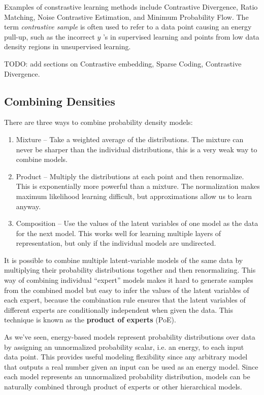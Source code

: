 \documentclass{article}
\begin{document}
Examples of constrastive learning methods include Contrastive Divergence, Ratio Matching, Noise Contrastive Estimation, and Minimum Probability Flow. The term \textit{contrastive sample} is often used to refer to a data point causing an energy pull-up, such as the incorrect $y$ ’s in supervised learning and points from low data density regions in unsupervised learning.

TODO: add sections on Contrastive embedding, Sparse Coding, Contrastive Divergence.

\subsection{Combining Densities}
There are three ways to combine probability density models:
\begin{enumerate}
    \item Mixture -- Take a weighted average of the distributions. The mixture can never be sharper than the individual distributions, this is a very weak way to combine models. 
    \item Product -- Multiply the distributions at each point and then renormalize. This is exponentially more powerful than a mixture. The normalization makes maximum likelihood learning difficult, but approximations allow us to learn anyway. 
    \item Composition -- Use the values of the latent variables of one model as the data for the next model. This works well for learning multiple layers of representation, but only if the individual models are undirected.
\end{enumerate}

It is possible to combine multiple latent-variable models of the same data by multiplying their probability distributions together and then renormalizing. This way of combining individual ``expert” models makes it hard to generate samples from the combined model but easy to infer the values of the latent variables of each expert, because the combination rule
ensures that the latent variables of different experts are conditionally independent when given the data. This technique is known as the \textbf{product of experts} (PoE).

As we've seen, energy-based models represent probability distributions over data by assigning an unnormalized probability scalar, i.e. an energy, to each input data point. This provides useful modeling flexibility since any arbitrary model that outputs a real number given an input can be used as an energy model. Since each model represents an unnormalized probability distribution, models can be naturally combined through product of experts or other hierarchical models.
\end{document}
